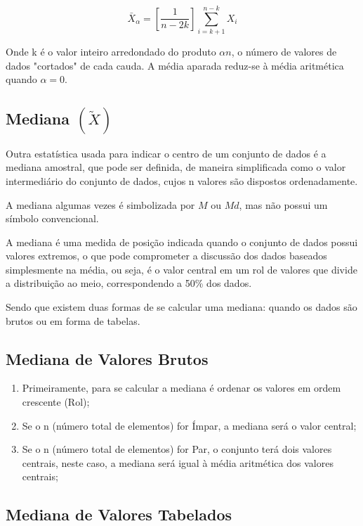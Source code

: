 \begin{equation}\label{aparada}
    \bar{X}_{\alpha} = \left[\frac{1}{n-2k} \right] \sum_{i=k+1}^{n-k}X_{i}
\end{equation}

Onde k é o valor inteiro arredondado do produto $\alpha n$, o número de valores de dados "cortados" de cada cauda. A média aparada reduz-se à média aritmética quando $\alpha = 0$.


\subsection{Mediana $(\widetilde{X})$}


\inic Outra estatística usada para indicar o centro de um conjunto de dados é a mediana amostral, que pode ser definida, de maneira simplificada como o valor intermediário do conjunto de dados, cujos n valores são dispostos ordenadamente.\vskip0.3cm


A mediana algumas vezes é simbolizada por $M$ ou $Md$, mas não possui um símbolo convencional.\vskip0.3cm



A mediana é uma medida de posição indicada quando o conjunto de dados possui valores extremos,
o que pode comprometer a discussão dos dados baseados simplesmente na média, ou seja, é o
valor central em um rol de valores que divide a distribuição ao meio, correspondendo a 50\% dos dados.\vskip0.3cm

Sendo que existem duas formas de se calcular uma mediana: quando os dados são brutos ou em forma de tabelas.\vskip0.3cm


\subsection{Mediana de Valores Brutos}


\begin{enumerate}
  \item Primeiramente, para se calcular a mediana é ordenar os valores em ordem crescente (Rol);
  \item Se o n (número total de elementos) for Ímpar, a mediana será o valor central;
  \item Se o n (número total de elementos) for Par, o conjunto terá dois valores centrais, neste caso, a mediana será igual à média aritmética dos valores centrais;
\end{enumerate}

\subsection{Mediana de Valores Tabelados}


